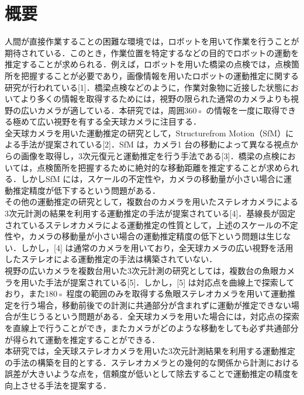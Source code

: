 \chapter*{概要}
\label{abst}
\def\thepage{}
\thispagestyle{empty}

人間が直接作業することの困難な環境では，ロボットを用いて作業を行うことが期待されている．このとき，作業位置を特定するなどの目的でロボットの運動を推定することが求められる．例えば，ロボットを用いた橋梁の点検では，点検箇所を把握することが必要であり，画像情報を用いたロボットの運動推定に関する研究が行われている[1]．橋梁点検などのように，作業対象物に近接した状態においてより多くの情報を取得するためには，視野の限られた通常のカメラよりも視野の広いカメラが適している．本研究では，周囲360◦ の情報を一度に取得できる極めて広い視野を有する全天球カメラに注目する．\\
全天球カメラを用いた運動推定の研究として，Structurefrom Motion（SfM）による手法が提案されている[2]．SfM は，カメラ1 台の移動によって異なる視点からの画像を取得し，3次元復元と運動推定を行う手法である[3]．橋梁の点検においては，点検箇所を把握するために絶対的な移動距離を推定することが求められる．しかしSfM には，スケールの不定性や，カメラの移動量が小さい場合に運動推定精度が低下するという問題がある．\\
その他の運動推定の研究として，複数台のカメラを用いたステレオカメラによる3次元計測の結果を利用する運動推定の手法が提案されている[4]．基線長が固定されているステレオカメラによる運動推定の性質として，上述のスケールの不定性や，カメラの移動量が小さい場合の運動推定精度の低下という問題は生じない．しかし，[4] は通常のカメラを用いており，全天球カメラの広い視野を活用したステレオによる運動推定の手法は構築されていない．\\
視野の広いカメラを複数台用いた3次元計測の研究としては，複数台の魚眼カメラを用いた手法が提案されている[5]．しかし，[5] は対応点を曲線上で探索しており，また180◦ 程度の範囲のみを取得する魚眼ステレオカメラを用いて運動推定を行う場合，移動前後での計測に共通部分が含まれずに運動が推定できない場合が生じうるという問題がある．全天球カメラを用いた場合には，対応点の探索を直線上で行うことができ，またカメラがどのような移動をしても必ず共通部分が得られて運動を推定することができる．\\
本研究では，全天球ステレオカメラを用いた3次元計測結果を利用する運動推定の手法の構築を目的とする．ステレオカメラとの幾何的な関係から計測における誤差が大きいような点を，信頼度が低いとして除去することで運動推定の精度を向上させる手法を提案する．

